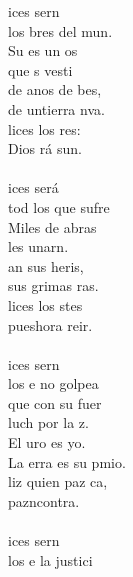 \begin{cancion}%
	ices sern\\
	los bres del mun.\\
	Su  es un os\\
	que s vesti \\
	de anos de bes,\\
	de untierra nva.\\
	lices los res:\\
	Dios rá sun.\\
\jump\\
	ices será\\
	tod los que sufre\\
	Miles de abras\\
	les unarn.\\
	an sus heris,\\
	sus grimas ras. \\
	lices los stes\\
	pueshora reir.\\
\jump\\
	ices sern\\
	los e no golpea\\
	 que con su fuer\\
	luch por la z.\\
	El uro es yo.\\
	La erra es su pmio.\\
	liz quien paz ca,\\
	pazncontra.\\
\jump\\
	ices sern\\
	los e la justici\\

\end{cancion}
